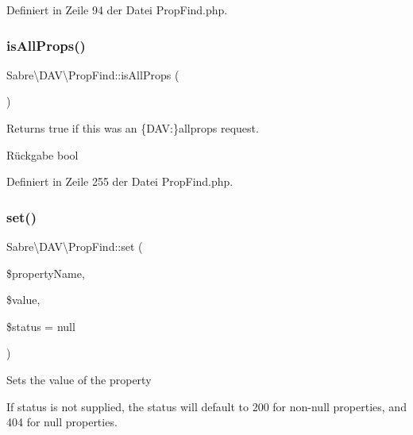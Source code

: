 Definiert in Zeile 94 der Datei Prop\+Find.\+php.

\mbox{\label{class_sabre_1_1_d_a_v_1_1_prop_find_a8947ace0bae6303bc2cfd2385a014bb6}} 
\subsubsection{\texorpdfstring{is\+All\+Props()}{isAllProps()}}
{\footnotesize\ttfamily Sabre\textbackslash{}\+D\+A\+V\textbackslash{}\+Prop\+Find\+::is\+All\+Props (\begin{DoxyParamCaption}{ }\end{DoxyParamCaption})}

Returns true if this was an \textquotesingle{}\{D\+AV\+:\}allprops\textquotesingle{} request.

\begin{DoxyReturn}{Rückgabe}
bool 
\end{DoxyReturn}


Definiert in Zeile 255 der Datei Prop\+Find.\+php.

\mbox{\label{class_sabre_1_1_d_a_v_1_1_prop_find_a00b65adb1bab015c7f65ba6d8eb0a77e}} 
\subsubsection{\texorpdfstring{set()}{set()}}
{\footnotesize\ttfamily Sabre\textbackslash{}\+D\+A\+V\textbackslash{}\+Prop\+Find\+::set (\begin{DoxyParamCaption}\item[{}]{\$property\+Name,  }\item[{}]{\$value,  }\item[{}]{\$status = {\ttfamily null} }\end{DoxyParamCaption})}

Sets the value of the property

If status is not supplied, the status will default to 200 for non-\/null properties, and 404 for null properties.


